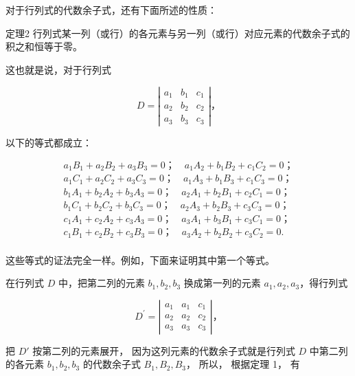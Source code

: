 对于行列式的代数余子式，还有下面所述的性质：

定理2
行列式某一列（或行）的各元素与另一列（或行）对应元素的代数余子式的积之和恒等于零。

这也就是说，对于行列式

\[
D = \left| \begin{array}{ccc} a _ {1} & b _ {1} & c _ {1} \\ a _ {2} & b _ {2} & c _ {2} \\ a _ {3} & b _ {3} & c _ {3} \end{array} \right|\text{，}
\]

以下的等式都成立：

\[
\begin{array}{l} a _ {1} B _ {1} + a _ {2} B _ {2} + a _ {3} B _ {3} = 0\text{；} \quad a _ {1} A _ {2} + b _ {1} B _ {2} + c _ {1} C _ {2} = 0\text{；} \\ a _ {1} C _ {1} + a _ {2} C _ {2} + a _ {3} C _ {3} = 0\text{；} \quad a _ {1} A _ {3} + b _ {1} B _ {3} + c _ {1} C _ {3} = 0\text{；} \\ b _ {1} A _ {1} + b _ {2} A _ {2} + b _ {3} A _ {3} = 0\text{；} \quad a _ {2} A _ {1} + b _ {2} B _ {1} + c _ {2} C _ {1} = 0\text{；} \\ b _ {1} C _ {1} + b _ {2} C _ {2} + b _ {3} C _ {3} = 0\text{；} \quad a _ {2} A _ {3} + b _ {2} B _ {3} + c _ {3} C _ {3} = 0\text{；} \\ c _ {1} A _ {1} + c _ {2} A _ {2} + c _ {3} A _ {3} = 0\text{；} \quad a _ {3} A _ {1} + b _ {3} B _ {1} + c _ {3} C _ {1} = 0\text{；} \\ c _ {1} B _ {1} + c _ {2} B _ {2} + c _ {3} B _ {3} = 0\text{；} \quad a _ {3} A _ {2} + b _ {2} B _ {2} + c _ {3} C _ {2} = 0. \\ \end{array}
\]

这些等式的证法完全一样。例如，下面来证明其中第一个等式。

 在行列式 \(D\) 中，把第二列的元素
\(b_{1}, b_{2}, b_{3}\) 换成第一列的元素
\(a_{1}, a_{2}, a_{3}\)，得行列式

\[
D ^ {\prime} = \left| \begin{array}{ccc} a _ {1} & a _ {1} & c _ {1} \\ a _ {2} & a _ {2} & c _ {2} \\ a _ {3} & a _ {3} & c _ {3} \end{array} \right|\text{，}
\]

把 \(D'\) 按第二列的元素展开， 因为这列元素的代数余子式就是行列式 \(D\)
中第二列的各元素 \(b_{1}, b_{2}, b_{3}\) 的代数余子式
\(B_{1}, B_{2}, B_{3}\)， 所以， 根据定理 1， 有

